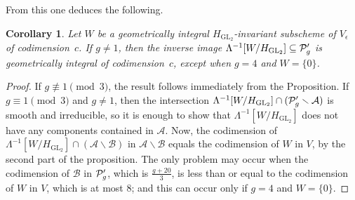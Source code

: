 \documentclass{amsart}
\numberwithin{equation}{section}
\numberwithin{subsection}{section}
\newtheorem{corollary}[theorem]{Corollary}
\theoremstyle{definition}
\theoremstyle{remark}
\newcommand\cA{\mathcal{A}} \newcommand\cB{\mathcal{B}}
\renewcommand{\setminus}{\smallsetminus}
\newcommand{\GL}{\mathrm{GL}}
\newcommand\Hg{H_{\GL_2}}
\newcommand\Ve{V_{\epsilon}}
\begin{document}
From this one deduces the following.

\begin{corollary}\label{cor:integral-inverse-image}
Let $W$ be a geometrically integral $\Hg$-invariant subscheme of $\Ve$ of codimension~$c$. If $g \neq 1$, then the inverse image $\Lambda^{-1}[W/\Hg] \subseteq \cP'_{g}$ is geometrically integral of codimension~$c$, except when $g = 4$ and $W = \{0\}$.
\end{corollary}

\begin{proof}
If $g \not\equiv 1 \pmod 3$, the result follows immediately from the Proposition. If $g \equiv 1 \pmod 3$ and $g \neq 1$, then the intersection $\Lambda^{-1}[W/\Hg] \cap (\cP'_{g} \setminus \cA)$ is smooth and irreducible, so it is enough to show that $\Lambda^{-1}[W/\Hg]$ does not have any components contained in $\cA$. Now, the codimension of $\Lambda^{-1}[W/\Hg] \cap(\cA \setminus\cB)$ in $\cA \setminus\cB$ equals the codimension of $W$ in $V$, by the second part of the proposition. The only problem may occur when the codimension of $\cB$ in $\mathcal{P}'_{g}$, which is $\frac{g+20}{3}$, is less than or equal to the codimension of $W$ in $V$, which is at most 8; and this can occur only if $g = 4$ and $W = \{0\}$.
\end{proof}
\end{document}
